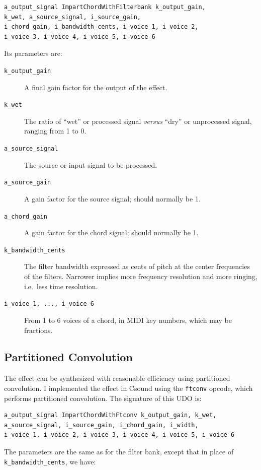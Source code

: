 \documentclass[runningheads,a4paper]{llncs}
\begin{document}
\begin{lstlisting}
a_output_signal ImpartChordWithFilterbank k_output_gain, 
k_wet, a_source_signal, i_source_gain, 
i_chord_gain, i_bandwidth_cents, i_voice_1, i_voice_2, 
i_voice_3, i_voice_4, i_voice_5, i_voice_6
\end{lstlisting}

\noindent Its parameters are:

\begin{description}
 \item[\texttt{k\_output\_gain}] A final gain factor for the output of 
the effect.
 \item[\texttt{k\_wet}] The ratio of ``wet'' or processed signal \emph{versus} 
``dry'' or unprocessed signal, ranging from 1 to 0.
 \item[\texttt{a\_source\_signal}] The source or input signal to be processed.
 \item[\texttt{a\_source\_gain}] A gain factor for the source signal; should 
normally be 1.
 \item[\texttt{a\_chord\_gain}] A gain factor for the chord signal; should 
normally be 1.
 \item[\texttt{k\_bandwidth\_cents}] The filter bandwidth expressed as cents 
of pitch at the center frequencies of the filters. Narrower implies more 
frequency resolution and more ringing, i.e.\ less time resolution.
 \item[\texttt{i\_voice\_1, ..., i\_voice\_6}] From 1 to 6 voices of a 
chord, in MIDI key numbers, which may be fractions.
\end{description}

\subsection{Partitioned Convolution}

The effect can be synthesized with reasonable efficiency using partitioned 
convolution. I implemented the effect in Csound using the \texttt{ftconv} 
\cite{csoundmanualftconv} opcode, which performs partitioned convolution. The 
signature of this UDO is: 

\begin{lstlisting}
a_output_signal ImpartChordWithFtconv k_output_gain, k_wet, 
a_source_signal, i_source_gain, i_chord_gain, i_width, 
i_voice_1, i_voice_2, i_voice_3, i_voice_4, i_voice_5, i_voice_6
\end{lstlisting}

\noindent The parameters are the same as for the filter bank, except that in 
place of \texttt{k\_bandwidth\_cents}, we have:
\end{document}
